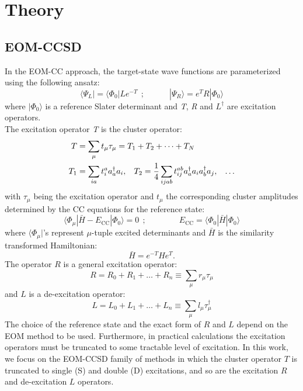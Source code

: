 \documentclass[journal=jctcce,manuscript=article]{achemso}
\begin{document}
\section{Theory}

\subsection{EOM-CCSD}
In the EOM-CC approach, the target-state wave functions are parameterized using the following ansatz:~\cite{sekino1984linear,Stanton:93:EOMCC,CC_EOMCC_Bartlett,krylov_eom_2008}
\begin{equation}
\langle \Psi_L | = \langle \Phi_0 |{L}e^{-T}~~;
\quad \quad \quad | \Psi_R \rangle =  e^{T} {R}| \Phi_0 \rangle 
\end{equation}
where $| \Phi_0 \rangle $ is a reference Slater determinant and \textit{T}, \textit{R} and $L^\dagger$ are excitation operators.\\
The excitation operator \textit{T} is the cluster operator:\cite{Note-1}
\begin{equation}
\begin{aligned}
T &= \sum_{\mu} t_{\mu} \tau_{\mu} = T_1 + T_2 + \dots + T_N \\
T_1 &= \sum_{ia} t_i^a a_a^{\dagger}a_i ,\hspace{0.3cm}  T_2 = \frac{1}{4}\sum_{ijab} t_{ij}^{ab} a_a^{\dagger}a_i a_b^{\dagger}a_j ,\hspace{0.3cm}\dots 
\end{aligned}
\end{equation}
with $\tau_{\mu}$ being the excitation operator and $t_{\mu}$ the corresponding cluster amplitudes determined by the CC equations for the reference state:
\begin{equation}
\langle \Phi_\mu | \bar{H} - E_\text{CC} | \Phi_0 \rangle = 0~~; 
\qquad\qquad E_\text{CC} = \langle \Phi_0| \bar{H} | \Phi_0 \rangle
\end{equation}
where $\langle \Phi_\mu |$'s represent $\mu$-tuple excited determinants and $\bar{H}$ is the similarity transformed Hamiltonian:
\begin{equation}
\bar{H} = e^{-T} H e^{T}.
\end{equation}
The operator $R$ is a general excitation operator:
  \begin{equation}
   R = R_0 + R_1 + \dots + R_n \equiv \sum_\mu r_\mu \tau_\mu
   \end{equation}
and $L$ is a de-excitation operator:
  \begin{equation}
   L = L_0 + L_1 + \dots + L_n \equiv \sum_\mu l_\mu \tau^\dagger_\mu
   \end{equation}
  The choice of the reference state and the exact form of $R$ and $L$ depend on the EOM method to be used\cite{krylov_eom_2008,CC_EOMCC_Bartlett}.
  Furthermore, in practical calculations the excitation {\color{red}{and de-excitation}} operators must be truncated to some tractable level of excitation. 
In this work, we focus on the EOM-CCSD family of methods in which
the cluster operator $T$ is truncated to single (S) and double (D) excitations, and so are the excitation $R$ and de-excitation $L$ operators.
\end{document}
